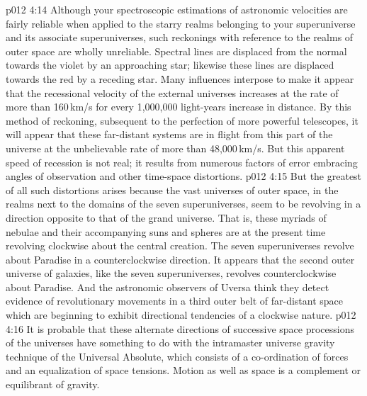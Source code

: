 \vs p012 4:14 \pc Although your spectroscopic estimations of astronomic velocities are fairly reliable when applied to the starry realms belonging to your superuniverse and its associate superuniverses, such reckonings with reference to the realms of outer space are wholly unreliable. Spectral lines are displaced from the normal towards the violet by an approaching star; likewise these lines are displaced towards the red by a receding star. Many influences interpose to make it appear that the recessional velocity of the external universes increases at the rate of more than 160\,km/s for every 1,000,000 light\hyp{}years increase in distance. By this method of reckoning, subsequent to the perfection of more powerful telescopes, it will appear that these far\hyp{}distant systems are in flight from this part of the universe at the unbelievable rate of more than 48,000\,km/s. But this apparent speed of recession is not real; it results from numerous factors of error embracing angles of observation and other time\hyp{}space distortions.
\vs p012 4:15 But the greatest of all such distortions arises because the vast universes of outer space, in the realms next to the domains of the seven superuniverses, seem to be revolving in a direction opposite to that of the grand universe. That is, these myriads of nebulae and their accompanying suns and spheres are at the present time revolving clockwise about the central creation. The seven superuniverses revolve about Paradise in a counterclockwise direction. It appears that the second outer universe of galaxies, like the seven superuniverses, revolves counterclockwise about Paradise. And the astronomic observers of Uversa think they detect evidence of revolutionary movements in a third outer belt of far\hyp{}distant space which are beginning to exhibit directional tendencies of a clockwise nature.
\vs p012 4:16 It is probable that these alternate directions of successive space processions of the universes have something to do with the intramaster universe gravity technique of the Universal Absolute, which consists of a co\hyp{}ordination of forces and an equalization of space tensions. Motion as well as space is a complement or equilibrant of gravity.
